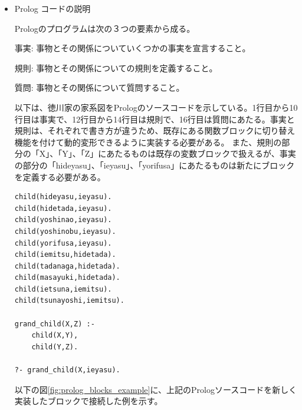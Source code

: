\documentclass{risepaper}
\begin{document}
\begin{itemize}   

\item Prolog コードの説明

Prologのプログラムは次の３つの要素から成る。

事実: 事物とその関係についていくつかの事実を宣言すること。

規則: 事物とその関係についての規則を定義すること。

質問: 事物とその関係について質問すること。

以下は、徳川家の家系図をPrologのソースコードを示している。1行目から10行目は事実で、12行目から14行目は規則で、16行目は質問にあたる。事実と規則は、それぞれで書き方が違うため、既存にある関数ブロックに切り替え機能を付けて動的変形できるように実装する必要がある。
また、規則の部分の「X」、「Y」、「Z」にあたるものは既存の変数ブロックで扱えるが、事実の部分の「hideyasu」、「ieyasu」、「yorifusa」にあたるものは新たにブロックを定義する必要がある。
\begin{lstlisting}[basicstyle=\ttfamily\footnotesize]
child(hideyasu,ieyasu).
child(hidetada,ieyasu).
child(yoshinao,ieyasu).
child(yoshinobu,ieyasu).
child(yorifusa,ieyasu).
child(iemitsu,hidetada).
child(tadanaga,hidetada).
child(masayuki,hidetada).
child(ietsuna,iemitsu).
child(tsunayoshi,iemitsu).

grand_child(X,Z) :-
    child(X,Y),
    child(Y,Z).

?- grand_child(X,ieyasu).
\end{lstlisting}

以下の図\ref{fig:prolog_blocks_example}に、上記のPrologソースコードを新しく実装したブロックで接続した例を示す。


\end{itemize}
\end{document}
